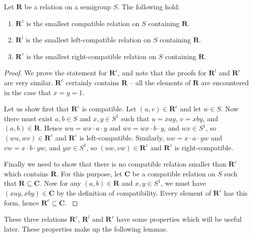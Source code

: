 \begin{lemma}
  \label{lem:rc}
  Let $\mathbf{R}$ be a relation on a semigroup $S$.
  The following hold:
  \begin{enumerate}
  \item $\mathbf{R}^c$ is the smallest compatible relation on $S$ containing
    $\mathbf{R}$.
  \item $\mathbf{R}^l$ is the smallest left-compatible relation on $S$
    containing $\mathbf{R}$.
  \item $\mathbf{R}^r$ is the smallest right-compatible relation on $S$
    containing $\mathbf{R}$.
  \end{enumerate}
  \begin{proof}
    We prove the statement for $\mathbf{R}^c$, and note that the proofs for
    $\mathbf{R}^l$ and $\mathbf{R}^r$ are very similar.
    $\mathbf{R}^c$ certainly contains $\mathbf{R}$ -- all the elements of
    $\mathbf{R}$ are encountered in the case that $x=y=1$.

    Let us show first that $\mathbf{R}^c$ is compatible.
    Let $(u,v) \in \mathbf{R}^c$ and let $w \in S$.  Now there must exist $a,b
    \in S$ and $x,y \in S^1$ such that $u=xay$, $v=xby$, and $(a,b) \in
    \mathbf{R}$.  Hence
    $wu = wx \cdot a \cdot y$ and
    $wv = wx \cdot b \cdot y$, and $wx \in S^1$,
    so $(wu,wv) \in \mathbf{R}^c$ and $\mathbf{R}^c$ is left-compatible.
    Similarly,
    $uw = x \cdot a \cdot yw$ and
    $vw = x \cdot b \cdot yw$, and $yw \in S^1$,
    so $(uw,vw) \in \mathbf{R}^c$ and $\mathbf{R}^c$ is right-compatible.

    Finally we need to show that there is no compatible relation smaller than
    $\mathbf{R}^c$ which contains $\mathbf{R}$.  For this purpose, let
    $\mathbf{C}$ be a compatible relation on $S$ such that $\mathbf{R} \subseteq
    \mathbf{C}$.  Now for any $(a,b) \in \mathbf{R}$ and $x,y \in S^1$, we must
    have $(xay,xby) \in \mathbf{C}$ by the definition of compatibility.  Every
    element of $\mathbf{R}^c$ has this form, hence $\mathbf{R}^c \subseteq
    \mathbf{C}$. \cite[p.26]{howie}
  \end{proof}
\end{lemma}

These three relations $\mathbf{R}^c$, $\mathbf{R}^l$ and $\mathbf{R}^r$ have
some properties which will be useful later.  These properties make up the
following lemmas.

